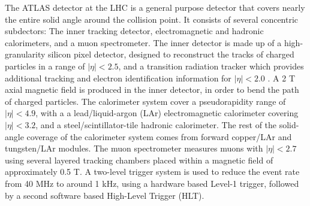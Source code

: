 The ATLAS detector \cite{} at the LHC is a general purpose detector that covers nearly the entire solid angle around the collision point. It consists of several concentric subdectors: The inner tracking detector, electromagnetic and hadronic calorimeters, and a muon spectrometer. The inner detector is made up of a high-granularity silicon pixel detector, designed to reconstruct the tracks of charged particles in a range of $|\eta|< 2.5$, and a transition radiation tracker which provides additional tracking and electron identification information for $|\eta|< 2.0$ \cite{}. A 2 T axial magnetic field is produced in the inner detector, in order to bend the path of charged particles. The calorimeter system cover a pseudorapidity range of $|\eta|< 4.9$, with a a lead/liquid-argon (LAr) electromagnetic calorimeter covering $|\eta|< 3.2$, and a steel/scintillator-tile hadronic calorimeter. The rest of the solid-angle coverage of the calorimeter system comes from forward copper/LAr and tungsten/LAr modules. The muon spectrometer measures muons with $|\eta|< 2.7$ using several layered tracking chambers placed within a magnetic field of approximately 0.5 T. A two-level trigger system \cite{} is used to reduce the event rate from 40 MHz to around 1 kHz, using a hardware based Level-1 trigger, followed by a second software based High-Level Trigger (HLT).
